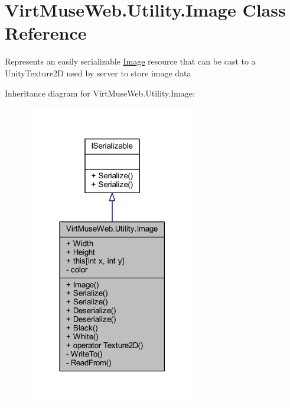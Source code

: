\hypertarget{class_virt_muse_web_1_1_utility_1_1_image}{}\section{Virt\+Muse\+Web.\+Utility.\+Image Class Reference}
\label{class_virt_muse_web_1_1_utility_1_1_image}


Represents an easily serializable \mbox{\hyperlink{class_virt_muse_web_1_1_utility_1_1_image}{Image}} resource that can be cast to a Unity\+Texture2D used by server to store image data  




Inheritance diagram for Virt\+Muse\+Web.\+Utility.\+Image\+:
\nopagebreak
\begin{figure}[H]
\begin{center}
\leavevmode
\includegraphics[width=213pt]{class_virt_muse_web_1_1_utility_1_1_image__inherit__graph}
\end{center}
\end{figure}


